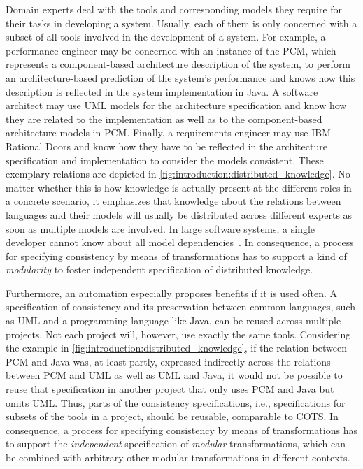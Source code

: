Domain experts deal with the tools and corresponding models they require for their tasks in developing a system.
Usually, each of them is only concerned with a subset of all tools involved in the development of a system.
For example, a performance engineer may be concerned with an instance of the \gls{PCM}, which represents a component-based architecture description of the system, to perform an architecture-based prediction of the system's performance and knows how this description is reflected in the system implementation in Java.
A software architect may use \gls{UML} models for the architecture specification and know how they are related to the implementation as well as to the component-based architecture models in \gls{PCM}.
Finally, a requirements engineer may use IBM Rational Doors and know how they have to be reflected in the architecture specification and implementation to consider the models consistent.
These exemplary relations are depicted in \autoref{fig:introduction:distributed_knowledge}.
No matter whether this is how knowledge is actually present at the different roles in a concrete scenario, it emphasizes that knowledge about the relations between languages and their models will usually be distributed across different experts as soon as multiple models are involved.
In large software systems, a single developer cannot know about all model dependencies~\cite{petrenko2008a}.
In consequence, a process for specifying consistency by means of transformations has to support a kind of \emph{modularity} to foster independent specification of distributed knowledge.

Furthermore, an automation especially proposes benefits if it is used often.
A specification of consistency and its preservation between common languages, such as \gls{UML} and a programming language like Java, can be reused across multiple projects.
Not each project will, however, use exactly the same tools.
Considering the example in \autoref{fig:introduction:distributed_knowledge}, if the relation between \gls{PCM} and Java was, at least partly, expressed indirectly across the relations between \gls{PCM} and \gls{UML} as well as \gls{UML} and Java, it would not be possible to reuse that specification in another project that only uses \gls{PCM} and Java but omits \gls{UML}.
Thus, parts of the consistency specifications, i.e., specifications for subsets of the tools in a project, should be reusable, comparable to \gls{COTS}.
In consequence, a process for specifying consistency by means of transformations has to support the \emph{independent} specification of \emph{modular} transformations, which can be combined with arbitrary other modular transformations in different contexts.


